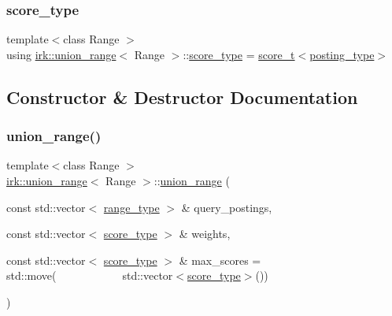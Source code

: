 \mbox{\label{classirk_1_1union__range_af728218b976df464ebb051a9e5358e93}} 
\subsubsection{\texorpdfstring{score\+\_\+type}{score\_type}}
{\footnotesize\ttfamily template$<$class Range $>$ \\
using \mbox{\hyperlink{classirk_1_1union__range}{irk\+::union\+\_\+range}}$<$ Range $>$\+::\mbox{\hyperlink{classirk_1_1union__range_af728218b976df464ebb051a9e5358e93}{score\+\_\+type}} =  \mbox{\hyperlink{namespaceirk_a87bce44d1e3fdff0b1b3bb78f2a5f924}{score\+\_\+t}}$<$\mbox{\hyperlink{classirk_1_1union__range_ac125c83e17d473ee5480fef76cfe42f9}{posting\+\_\+type}}$>$}



\subsection{Constructor \& Destructor Documentation}
\mbox{\label{classirk_1_1union__range_a64113cb12f111b46248be984b3ca16c2}} 
\subsubsection{\texorpdfstring{union\+\_\+range()}{union\_range()}}
{\footnotesize\ttfamily template$<$class Range $>$ \\
\mbox{\hyperlink{classirk_1_1union__range}{irk\+::union\+\_\+range}}$<$ Range $>$\+::\mbox{\hyperlink{classirk_1_1union__range}{union\+\_\+range}} (\begin{DoxyParamCaption}\item[{const std\+::vector$<$ \mbox{\hyperlink{classirk_1_1union__range_aae1621f1e73b1b78990ad11eaa52452b}{range\+\_\+type}} $>$ \&}]{query\+\_\+postings,  }\item[{const std\+::vector$<$ \mbox{\hyperlink{classirk_1_1union__range_af728218b976df464ebb051a9e5358e93}{score\+\_\+type}} $>$ \&}]{weights,  }\item[{const std\+::vector$<$ \mbox{\hyperlink{classirk_1_1union__range_af728218b976df464ebb051a9e5358e93}{score\+\_\+type}} $>$ \&}]{max\+\_\+scores = {\ttfamily std\+:\+:move(~~~~~~~~~~~~std\+:\+:vector$<$\mbox{\hyperlink{classirk_1_1union__range_af728218b976df464ebb051a9e5358e93}{score\+\_\+type}}$>$())} }\end{DoxyParamCaption})\hspace{0.3cm}{\ttfamily [inline]}}



